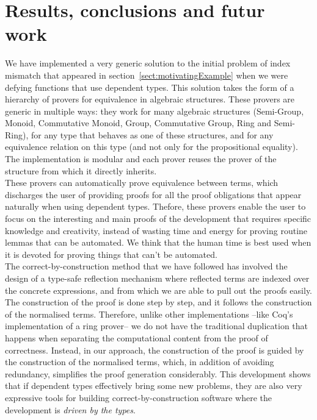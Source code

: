 \section{Results, conclusions and futur work}

We have implemented a very generic solution to the initial problem of index mismatch that appeared in section~\ref{sect:motivatingExample} when we were defying functions that use dependent types. This solution takes the form of a hierarchy of provers for equivalence in algebraic structures. These provers are generic in multiple ways: they work for many algebraic structures (Semi-Group, Monoid, Commutative Monoid, Group, Commutative Group, Ring and Semi-Ring), for any type that behaves as one of these structures, and for any equivalence relation on this type (and not only for the propositional equality). The implementation is modular and each prover reuses the prover of the structure from which it directly inherits. \\

These provers can automatically prove equivalence between terms, which discharges the user of providing proofs for all the proof obligations that appear naturally when using dependent types. Thefore, these provers enable the user to focus on the interesting and main proofs of the development that requires specific knowledge and creativity, instead of wasting time and energy for proving routine lemmas that can be automated. We think that the human time is best used when it is devoted for proving things that can't be automated. \\

The correct-by-construction method that we have followed has involved the design of a type-safe reflection mechanism where reflected terms are indexed over the concrete expressions, and from which we are able to pull out the proofs easily. The construction of the proof is done step by step, and it follows the construction of the normalised terms. Therefore, unlike other implementations --like Coq's implementation of a ring prover-- we do not have the traditional duplication that happens when separating the computational content from the proof of correctness. Instead, in our approach, the construction of the proof is guided by the construction of the normalised terms, which, in addition of avoiding redundancy, simplifies the proof generation considerably. This development shows that if dependent types effectively bring some new problems, they are also very expressive tools for building correct-by-construction software where the development is \emph{driven by the types}. \\

